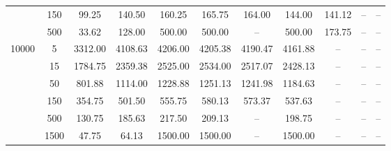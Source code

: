 \begin{table*}[!htbp]
\begin{adjustbox}{width=0.9\textwidth}
\begin{tabular}{|cc|cccc|cc|ccc|}
 & 150 & 99.25   & 140.50  & 160.25  & 165.75  & 164.00  & 144.00 & 141.12  & --      & -- \\
 & 500 & 33.62   & 128.00  & 500.00  & 500.00  & --      & 500.00 & 173.75  & --      & -- \\
\midrule
\multirow{6}{*}{10000} & 5   & 3312.00 & 4108.63 & 4206.00 & 4205.38 & 4190.47 & 4161.88 & --      & --      & -- \\
 & 15  & 1784.75 & 2359.38 & 2525.00 & 2534.00 & 2517.07 & 2428.13 & --      & --      & -- \\
 & 50  & 801.88  & 1114.00 & 1228.88 & 1251.13 & 1241.98 & 1184.63 & --      & --      & -- \\
 & 150 & 354.75  & 501.50  & 555.75  & 580.13  & 573.37  & 537.63 & --      & --      & -- \\
 & 500 & 130.75  & 185.63  & 217.50  & 209.13  & --      & 198.75 & --      & --      & -- \\
 & 1500& 47.75   & 64.13   & 1500.00 & 1500.00 & --      & 1500.00 & --      & --      & -- \\
\bottomrule
\end{tabular}
\end{adjustbox}
\end{table*}
